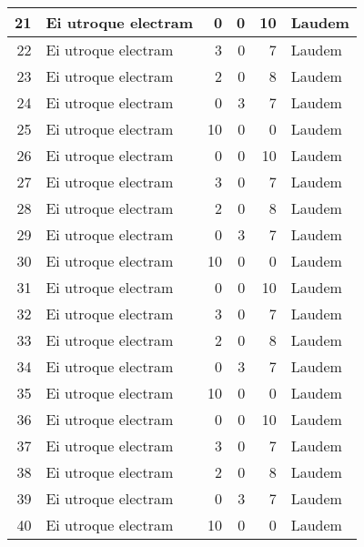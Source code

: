 \begin{small}
\begin{longtable}[c]{|r|l|r|r|r|l|}
21   & Ei utroque electram & 0  & 0  & 10 & Laudem  \\ \hline
22   & Ei utroque electram & 3  & 0  & 7  & Laudem  \\ \hline
23   & Ei utroque electram & 2  & 0  & 8  & Laudem  \\ \hline
24   & Ei utroque electram & 0  & 3  & 7  & Laudem  \\ \hline
25   & Ei utroque electram & 10 & 0  & 0  & Laudem  \\ \hline
26   & Ei utroque electram & 0  & 0  & 10 & Laudem  \\ \hline
27   & Ei utroque electram & 3  & 0  & 7  & Laudem  \\ \hline
28   & Ei utroque electram & 2  & 0  & 8  & Laudem  \\ \hline
29   & Ei utroque electram & 0  & 3  & 7  & Laudem  \\ \hline
30   & Ei utroque electram & 10 & 0  & 0  & Laudem  \\ \hline
31   & Ei utroque electram & 0  & 0  & 10 & Laudem  \\ \hline
32   & Ei utroque electram & 3  & 0  & 7  & Laudem  \\ \hline
33   & Ei utroque electram & 2  & 0  & 8  & Laudem  \\ \hline
34   & Ei utroque electram & 0  & 3  & 7  & Laudem  \\ \hline
35   & Ei utroque electram & 10 & 0  & 0  & Laudem  \\ \hline
36   & Ei utroque electram & 0  & 0  & 10 & Laudem  \\ \hline
37   & Ei utroque electram & 3  & 0  & 7  & Laudem  \\ \hline
38   & Ei utroque electram & 2  & 0  & 8  & Laudem  \\ \hline
39   & Ei utroque electram & 0  & 3  & 7  & Laudem  \\ \hline
40   & Ei utroque electram & 10 & 0  & 0  & Laudem  \\ \hline

\end{longtable}
\end{small}